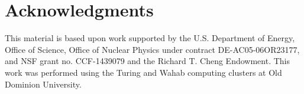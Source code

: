 \documentclass[aps,prl,preprint,12pt]{elsarticle}
\begin{document}
\section{Acknowledgments}

This material is based upon work supported by the U.S. Department of Energy, Office of Science, Office of Nuclear 
Physics under contract DE-AC05-06OR23177, and NSF grant no. CCF-1439079 and the Richard T. Cheng Endowment. 
This work was performed using the Turing and  Wahab computing clusters at Old Dominion University.
 
\newpage


\end{document}
